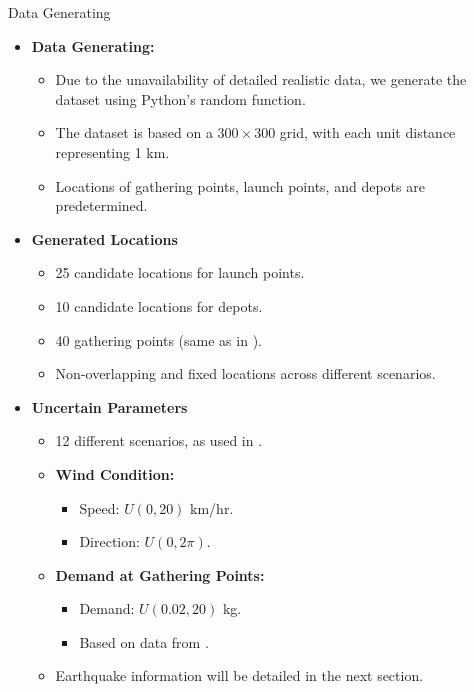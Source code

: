 \documentclass[aspectratio=169]{beamer}
\begin{document}
\begin{frame}{Data Generating}
    \begin{itemize}
    \item \textbf{Data Generating:}
        \begin{itemize}[label=$\star$]
            \scriptsize
            \item Due to the unavailability of detailed realistic data, we generate the dataset using Python's random function.
            \item The dataset is based on a $300 \times 300$ grid, with each unit distance representing 1 km.
            \item Locations of gathering points, launch points, and depots are predetermined.
        \end{itemize}
    
    \item \textbf{Generated Locations}
        \begin{itemize}[label=$\star$]
            \scriptsize
            \item 25 candidate locations for launch points.
            \item 10 candidate locations for depots.
            \item 40 gathering points (same as in \cite{dukkanci2023drones}).
            \item Non-overlapping and fixed locations across different scenarios.
        \end{itemize}
    
    \item \textbf{Uncertain Parameters}
        \begin{itemize}[label=$\star$]
            \scriptsize
            \item 12 different scenarios, as used in \cite{dukkanci2023drones}.
            \item \textbf{Wind Condition:}
            \begin{itemize}[label=$\diamond$]
                \item Speed: $U(0,20)$ km/hr.
                \item Direction: $U(0,2\pi)$.
            \end{itemize}
            \item \textbf{Demand at Gathering Points:}
            \begin{itemize}[label=$\diamond$]
                \item Demand: $U(0.02,20)$ kg.
                \item Based on data from \cite{dukkanci2023drones}.
            \end{itemize}
            \item Earthquake information will be detailed in the next section.
        \end{itemize}
    \end{itemize}
\end{frame}
\end{document}
